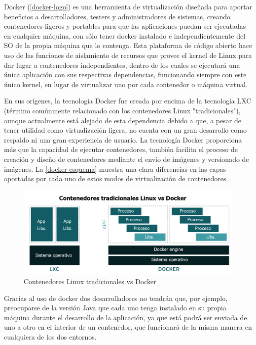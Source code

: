 Docker (\autoref{docker-logo}) es una herramienta de virtualización diseñada para aportar beneficios a desarrolladores, testers y administradores de sistemas, creando contenedores ligeros y portables para que las aplicaciones puedan ser ejecutadas en cualquier máquina, con sólo tener docker instalado e independientemente del \gls{SO} de la propia máquina que lo contenga\cite{garciaoterino2015}. Esta plataforma de código abierto hace uso de las funciones de aislamiento de recursos que provee el kernel de Linux para dar lugar a contenedores independientes, dentro de los cuales se ejecutará una única aplicación con sus respectivas dependencias, funcionando siempre con este único kernel, en lugar de virtualizar uno por cada contenedor o máquina virtual.

En sus orígenes, la tecnología Docker fue creada por encima de la tecnología LXC (término comúnmente relacionado con los contenedores Linux "tradicionales"), aunque actualmente está alejado de esta dependencia debido a que, a pesar de tener utilidad como virtualización ligera, no cuenta con un gran desarrollo como respaldo ni una gran experiencia de usuario. La tecnología Docker proporciona más que la capacidad de ejecutar contenedores, también facilita el proceso de creación y diseño de contenedores mediante el envío de imágenes y versionado de imágenes. La \autoref{docker-esquema} muestra una clara diferencias en las capas aportadas por cada uno de estos modos de virtualización de contenedores.

\begin{figure}[htbp]
	\centering
	\includegraphics[width=1.0\linewidth]
	{entorno/figuras/docker-esquema.png}
	\caption{Contenedores Linux tradicionales vs  Docker}
	\label{docker-esquema}
\end{figure}

Gracias al uso de docker dos desarrolladores no tendrán que, por ejemplo, preocuparse de la versión Java que cada uno tenga instalado en su propia máquina durante el desarrollo de la aplicación, ya que está podrá ser enviada de uno a otro en el interior de un contenedor, que funcionará de la misma manera en cualquiera de los dos entornos.


